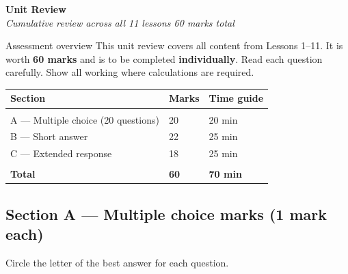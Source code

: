 \documentclass[11pt,a4paper]{article}
\newcommand{\sectiondiv}[3]{%
  \needspace{5\baselineskip}
  \begin{tcolorbox}[
    enhanced, breakable=false, arc=3.5mm,
    colback=ForestDark, colframe=ForestDark, boxrule=0pt,
    sidebyside, sidebyside align=center,
    lefthand width=2.0cm,
    left=2mm, right=4mm, top=4mm, bottom=4mm
  ]
    \begin{center}
      \label{sec:#1}%
      {\headingfont\bfseries\color{Forest!35!ForestDark}\fontsize{50}{50}\selectfont #1}
    \end{center}
    \tcblower
    {\headingfont\bfseries\color{white}\LARGE #2}\\[3pt]
    {\itshape\color{white!75!ForestDark}\small #3}
  \end{tcolorbox}%
}
\begin{document}
\newpage

\sectiondiv{}{Unit Review}{Cumulative review across all 11 lessons \textbullet{} 60 marks total}

\begin{infobox}{Assessment overview}
This unit review covers all content from Lessons 1--11. It is worth \textbf{60 marks} and is to be completed \textbf{individually}. Read each question carefully. Show all working where calculations are required.

\medskip
\begin{tabular}{@{}L{5cm} C{2.5cm} C{2.5cm}@{}}
  \textbf{Section} & \textbf{Marks} & \textbf{Time guide} \\[2pt]
  \hline\\[-6pt]
  A --- Multiple choice (20 questions) & 20 & 20 min \\[3pt]
  B --- Short answer                   & 22 & 25 min \\[3pt]
  C --- Extended response              & 18 & 25 min \\[3pt]
  \hline\\[-6pt]
  \textbf{Total}                       & \textbf{60} & \textbf{70 min} \\[3pt]
\end{tabular}
\end{infobox}

\subsection*{Section A --- Multiple choice \hfill \small{} marks (1 mark each)}

\noindent Circle the letter of the best answer for each question.
\end{document}
